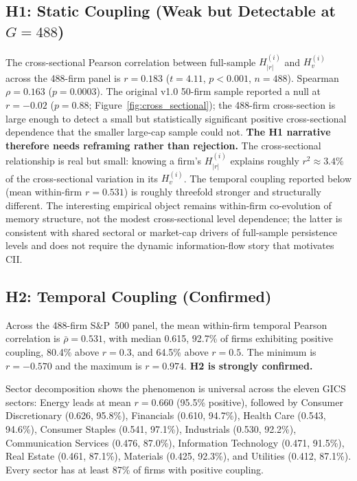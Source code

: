 \documentclass[preprint,12pt,authoryear]{elsarticle}
\begin{document}
\subsection{H1: Static Coupling (Weak but Detectable at $G = 488$)}

The cross-sectional Pearson correlation between full-sample $H^{(i)}_{|r|}$ and $H^{(i)}_{v}$ across the 488-firm panel is $r = 0.183$ ($t = 4.11$, $p < 0.001$, $n = 488$). Spearman $\rho = 0.163$ ($p = 0.0003$). The original v1.0 50-firm sample reported a null at $r = -0.02$ ($p = 0.88$; Figure~\ref{fig:cross_sectional}); the 488-firm cross-section is large enough to detect a small but statistically significant positive cross-sectional dependence that the smaller large-cap sample could not. \textbf{The H1 narrative therefore needs reframing rather than rejection.} The cross-sectional relationship is real but small: knowing a firm's $H^{(i)}_{|r|}$ explains roughly $r^2 \approx 3.4\%$ of the cross-sectional variation in its $H^{(i)}_{v}$. The temporal coupling reported below (mean within-firm $r = 0.531$) is roughly threefold stronger and structurally different. The interesting empirical object remains within-firm co-evolution of memory structure, not the modest cross-sectional level dependence; the latter is consistent with shared sectoral or market-cap drivers of full-sample persistence levels and does not require the dynamic information-flow story that motivates CII.

\subsection{H2: Temporal Coupling (Confirmed)}

Across the 488-firm S\&P~500 panel, the mean within-firm temporal Pearson correlation is $\bar{\rho} = 0.531$, with median 0.615, 92.7\% of firms exhibiting positive coupling, 80.4\% above $r = 0.3$, and 64.5\% above $r = 0.5$. The minimum is $r = -0.570$ and the maximum is $r = 0.974$. \textbf{H2 is strongly confirmed.}

Sector decomposition shows the phenomenon is universal across the eleven GICS sectors: Energy leads at mean $r = 0.660$ (95.5\% positive), followed by Consumer Discretionary (0.626, 95.8\%), Financials (0.610, 94.7\%), Health Care (0.543, 94.6\%), Consumer Staples (0.541, 97.1\%), Industrials (0.530, 92.2\%), Communication Services (0.476, 87.0\%), Information Technology (0.471, 91.5\%), Real Estate (0.461, 87.1\%), Materials (0.425, 92.3\%), and Utilities (0.412, 87.1\%). Every sector has at least 87\% of firms with positive coupling.
\end{document}
